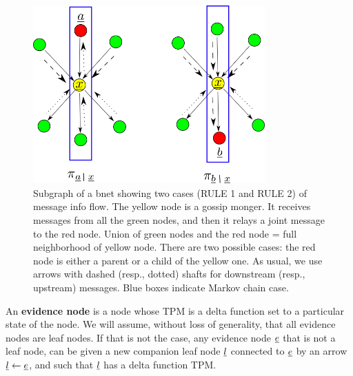 \begin{figure}[h!]
\centering
\includegraphics[width=3.5in]
{mpass/mpass-messages.png}
\caption{
Subgraph of a bnet
showing two cases (RULE 1
 and RULE 2)
of message info flow.
The yellow
node is a gossip monger.
It receives messages from
all the green nodes,
and then it relays a joint
message to the red node.
Union of green nodes and the red node = full
 neighborhood of yellow node.
There are two possible
cases: the
red node is either a parent
or a child of the yellow
one. As usual, we use arrows with
dashed (resp., dotted) shafts for
downstream (resp., upstream) messages.
Blue boxes indicate Markov chain case. }
\label{fig-messages-gen}
\end{figure}

An {\bf evidence node} is a
node whose TPM is a delta function
set to a particular state of the node.
We will assume, without loss of generality,
that all evidence nodes are leaf nodes.
If that is not the case,
any
evidence node ${\underline{e}}$
that is not
a leaf node,
can be given a new
companion leaf node ${\underline{l}}$
connected to ${\underline{e}}$ by
an arrow ${\underline{l}}\leftarrow {\underline{e}}$,
and such that
${\underline{l}}$ has a delta
function TPM.



